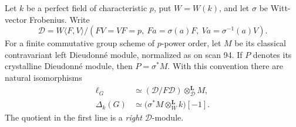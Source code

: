 \begin{proposition}
\label{B:coLie-Dieudonne}
Let $k$ be a perfect field of characteristic $p$, put $W=W(k)$, and
let $\sigma$ be Witt-vector Frobenius. Write
\[
 \mathcal D=W\langle F,V\rangle/
 (FV=VF=p,\ Fa=\sigma(a)F,\ Va=\sigma^{-1}(a)V).
\]
For a finite commutative group scheme of $p$-power order, let $M$
be its classical contravariant left Dieudonn\'e module, normalized
as on scan 94. If $P$ denotes its crystalline Dieudonn\'e module,
then $P=\sigma^*M$. With this convention there are natural
isomorphisms
\begin{align}
 \ell_G&\simeq(\mathcal D/F\mathcal D)
                 \otimes^{\mathbf L}_{\mathcal D}M,
                 \label{B:coLie-formula}\\
 \Delta_k(G)&\simeq
       \bigl(\sigma^*M\otimes_W^{\mathbf L}k\bigr)[-1].
                 \label{B:Delta-field}
\end{align}
The quotient in the first line is a \emph{right} $\mathcal D$-module.
\end{proposition}


